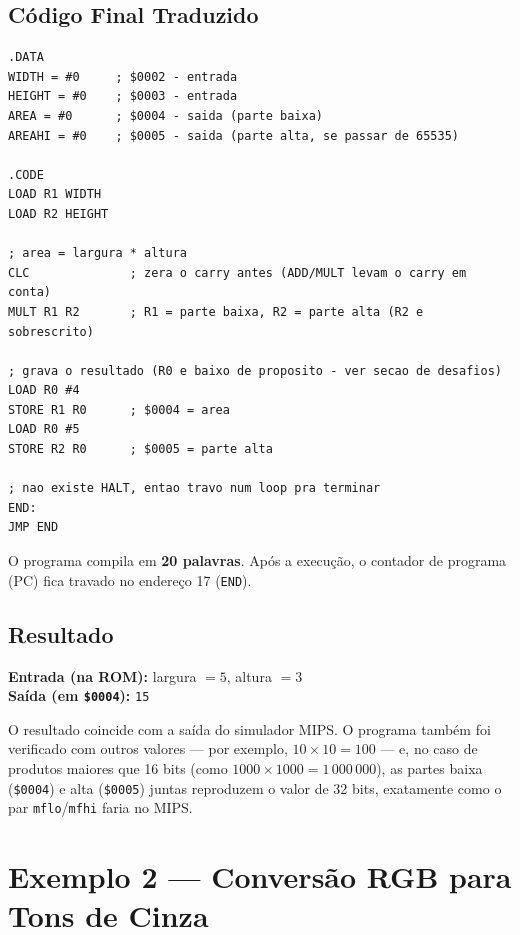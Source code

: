 \documentclass[12pt, a4paper]{article}
\begin{document}
\subsection{Código Final Traduzido}

\begin{lstlisting}[style=asm, caption={ex1.s --- versão final em Excel-ASM16}]
.DATA
WIDTH = #0     ; $0002 - entrada
HEIGHT = #0    ; $0003 - entrada
AREA = #0      ; $0004 - saida (parte baixa)
AREAHI = #0    ; $0005 - saida (parte alta, se passar de 65535)

.CODE
LOAD R1 WIDTH
LOAD R2 HEIGHT

; area = largura * altura
CLC              ; zera o carry antes (ADD/MULT levam o carry em conta)
MULT R1 R2       ; R1 = parte baixa, R2 = parte alta (R2 e sobrescrito)

; grava o resultado (R0 e baixo de proposito - ver secao de desafios)
LOAD R0 #4
STORE R1 R0      ; $0004 = area
LOAD R0 #5
STORE R2 R0      ; $0005 = parte alta

; nao existe HALT, entao travo num loop pra terminar
END:
JMP END
\end{lstlisting}

O programa compila em \textbf{20 palavras}. Após a execução, o contador de programa (PC) fica travado no endereço 17 (\texttt{END}).

\subsection{Resultado}

\begin{destaque}
  \textbf{Entrada (na ROM):} \quad largura $= 5$, \quad altura $= 3$ \\[6pt]
  \textbf{Saída (em \texttt{\$0004}):} \quad \texttt{15}
\end{destaque}

O resultado coincide com a saída do simulador MIPS. O programa também foi verificado com outros valores --- por exemplo, $10 \times 10 = 100$ --- e, no caso de produtos maiores que 16 bits (como $1000 \times 1000 = 1\,000\,000$), as partes baixa (\texttt{\$0004}) e alta (\texttt{\$0005}) juntas reproduzem o valor de 32 bits, exatamente como o par \texttt{mflo}/\texttt{mfhi} faria no MIPS.

\section{Exemplo 2 --- Conversão RGB para Tons de Cinza}
\end{document}
